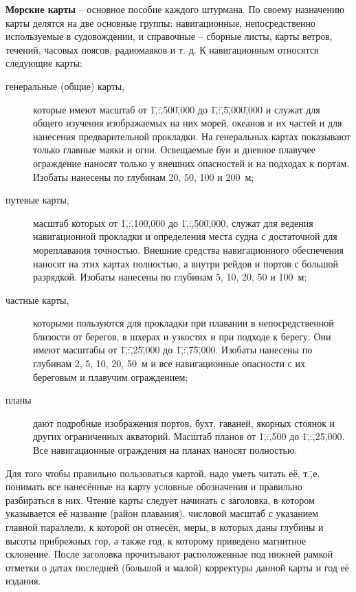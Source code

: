 \textbf{Морские карты} \--- основное пособие
каждого штурмана. По своему назначению карты делятся на две основные
группы: навигационные, непосредственно используемые в судовождении, и
справочные \--- сборные листы, карты ветров, течений, часовых поясов,
радиомаяков и т. д. К навигационным относятся следующие карты:

\begin{description}
\item [генеральные (общие) карты,] которые
  имеют масштаб от 1\=,:\=,500\=,000 до 1\=,:\=,5\=,000\=,000 и служат
  для общего изучения изображаемых на них морей, океанов и их частей и
  для нанесения предварительной прокладки. На генеральных картах
  показывают только главные маяки и огни. Освещаемые буи и дневное
  плавучее ограждение наносят только у внешних опасностей и на
  подходах к портам. Изобаты нанесены по глубинам 20, 50, 100 и 200~м;
\item[путевые карты,] масштаб которых от
  1\=,:\=,100\=,000 до 1\=,:\=,500\=,000, служат для ведения
  навигационной прокладки и определения места судна с достаточной для
  мореплавания точностью. Внешние средства навигационного обеспечения
  наносят на этих картах полностью, а внутри рейдов и портов с большой
  разрядкой. Изобаты нанесены по глубинам 5, 10, 20, 50 и 100~м;
\item[частные карты,] которыми пользуются для
  прокладки при плавании в непосредственной близости от берегов, в
  шхерах и узкостях и при подходе к берегу. Они имеют масштабы от
  1\=,:\=,25\=,000 до 1\=,:\=,75\=,000. Изобаты нанесены по глубинам
  2, 5, 10, 20, 50~м и все навигационные опасности с их береговым и
  плавучим ограждением;
\item[планы] дают подробные
  изображения портов, бухт, гаваней, якорных стоянок и других
  ограниченных акваторий. Масштаб планов от 1\=,:\=,500 до
  1\=,:\=,25\=,000. Все навигационные ограждения на планах наносят
  полностью.
\end{description}

Для того чтобы правильно пользоваться картой, надо уметь читать её,
т.\=,е. понимать все нанесённые на карту условные обозначения и
правильно разбираться в них. Чтение карты следует начинать с
заголовка, в котором указывается её название (район плавания),
числовой масштаб с указанием главной параллели, к которой он отнесён,
меры, в которых даны глубины и высоты прибрежных гор, а также год, к
которому приведено магнитное склонение. После заголовка прочитывают
расположенные под нижней рамкой отметки о датах последней (большой и
малой) корректуры данной карты и год её издания.
 

